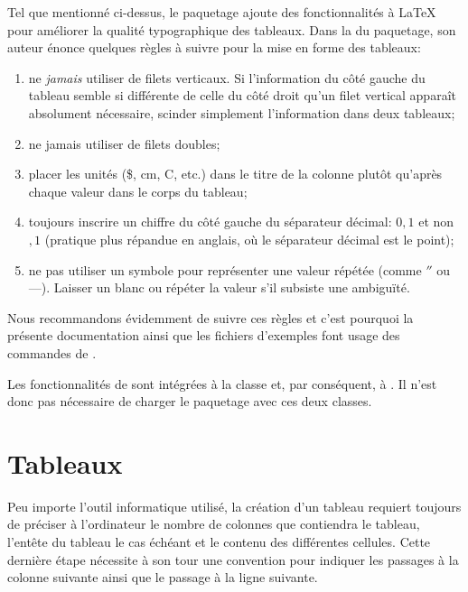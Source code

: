 Tel que mentionné ci-dessus, le paquetage  ajoute des
fonctionnalités à {\LaTeX} pour améliorer la qualité typographique des
tableaux. Dans la %
du paquetage, son auteur énonce quelques règles à suivre pour la mise
en forme des tableaux:
\begin{enumerate}
\item ne \emph{jamais} utiliser de filets verticaux. Si l'information
  du côté gauche du tableau semble si différente de celle du côté
  droit qu'un filet vertical apparaît absolument nécessaire, scinder
  simplement l'information dans deux tableaux;
\item ne jamais utiliser de filets doubles;
\item placer les unités (\$, cm, {\textdegree}C, etc.) dans le titre
  de la colonne plutôt qu'après chaque valeur dans le corps du
  tableau;
\item toujours inscrire un chiffre du côté gauche du séparateur
  décimal: $0,1$ et non $,1$ (pratique plus répandue en anglais, où le
  séparateur décimal est le point);
\item ne pas utiliser un symbole pour représenter une valeur
  répétée (comme $''$ ou ---). Laisser un blanc ou répéter la
  valeur s'il subsiste une ambiguïté.
\end{enumerate}

Nous recommandons évidemment de suivre ces règles et c'est pourquoi la
présente documentation ainsi que les fichiers d'exemples font usage
des commandes de .

Les fonctionnalités de  sont intégrées à la classe
 et, par conséquent, à . Il n'est donc pas
nécessaire de charger le paquetage avec ces deux classes.



\section{Tableaux}
\label{sec:tableaux:tableaux}

Peu importe l'outil informatique utilisé, la création d'un tableau
requiert toujours de préciser à l'ordinateur le nombre de colonnes que
contiendra le tableau, l'entête du tableau le cas échéant et le contenu
des différentes cellules. Cette dernière étape nécessite à son tour
une convention pour indiquer les passages à la colonne suivante
ainsi que le passage à la ligne suivante.

